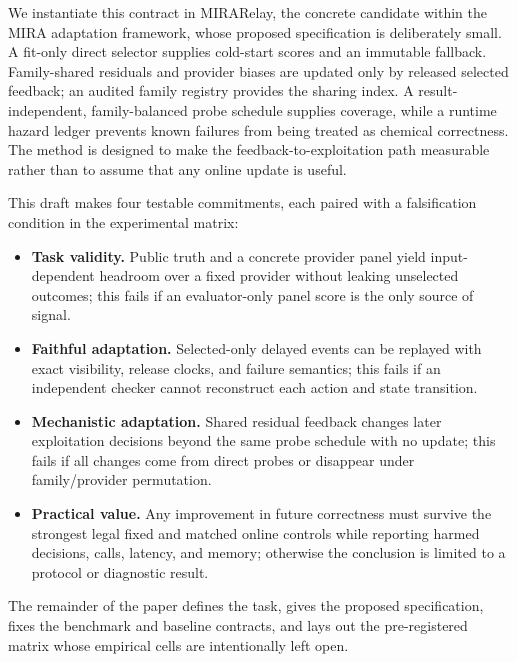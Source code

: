 \documentclass[sigconf,anonymous]{aamas}
\newcommand{\mira}{MIRA\text{-}Relay\xspace}
\begin{document}
We instantiate this contract in \mira, the concrete candidate within the MIRA adaptation framework, whose proposed specification is deliberately small. A fit-only direct selector supplies cold-start scores and an immutable fallback. Family-shared residuals and provider biases are updated only by released selected feedback; an audited family registry provides the sharing index. A result-independent, family-balanced probe schedule supplies coverage, while a runtime hazard ledger prevents known failures from being treated as chemical correctness. The method is designed to make the feedback-to-exploitation path measurable rather than to assume that any online update is useful.

This draft makes four testable commitments, each paired with a falsification condition in the experimental matrix:
\begin{itemize}[leftmargin=*,itemsep=1pt,topsep=2pt]
    \item \textbf{Task validity.} Public truth and a concrete provider panel yield input-dependent headroom over a fixed provider without leaking unselected outcomes; this fails if an evaluator-only panel score is the only source of signal.
    \item \textbf{Faithful adaptation.} Selected-only delayed events can be replayed with exact visibility, release clocks, and failure semantics; this fails if an independent checker cannot reconstruct each action and state transition.
    \item \textbf{Mechanistic adaptation.} Shared residual feedback changes later exploitation decisions beyond the same probe schedule with no update; this fails if all changes come from direct probes or disappear under family/provider permutation.
    \item \textbf{Practical value.} Any improvement in future correctness must survive the strongest legal fixed and matched online controls while reporting harmed decisions, calls, latency, and memory; otherwise the conclusion is limited to a protocol or diagnostic result.
\end{itemize}
The remainder of the paper defines the task, gives the proposed specification, fixes the benchmark and baseline contracts, and lays out the pre-registered matrix whose empirical cells are intentionally left open.
\end{document}
